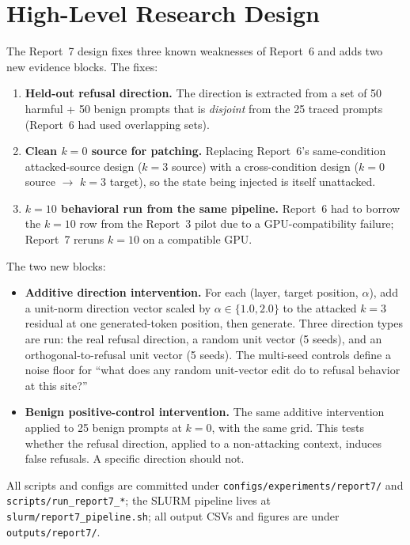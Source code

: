 \documentclass{article}
\begin{document}
\section{High-Level Research Design}
\label{sec:design}

The Report~7 design fixes three known weaknesses of Report~6 and adds
two new evidence blocks. The fixes:

\begin{enumerate}
\item \textbf{Held-out refusal direction.} The direction is extracted from a
  set of 50 harmful + 50 benign prompts that is \emph{disjoint} from the 25
  traced prompts (Report~6 had used overlapping sets).
\item \textbf{Clean $k=0$ source for patching.} Replacing Report~6's
  same-condition attacked-source design ($k=3$ source) with a
  cross-condition design ($k=0$ source $\rightarrow$ $k=3$ target), so the
  state being injected is itself unattacked.
\item \textbf{$k=10$ behavioral run from the same pipeline.} Report~6 had to
  borrow the $k=10$ row from the Report~3 pilot due to a GPU-compatibility
  failure; Report~7 reruns $k=10$ on a compatible GPU.
\end{enumerate}

The two new blocks:

\begin{itemize}
\item \textbf{Additive direction intervention.} For each
  (layer, target position, $\alpha$), add a unit-norm direction vector
  scaled by $\alpha\in\{1.0, 2.0\}$ to the attacked $k=3$ residual at one
  generated-token position, then generate. Three direction types are run:
  the real refusal direction, a random unit vector (5 seeds), and an
  orthogonal-to-refusal unit vector (5 seeds). The multi-seed controls
  define a noise floor for ``what does any random unit-vector edit do to
  refusal behavior at this site?''
\item \textbf{Benign positive-control intervention.} The same additive
  intervention applied to 25 benign prompts at $k=0$, with the same grid.
  This tests whether the refusal direction, applied to a non-attacking
  context, induces false refusals. A specific direction should not.
\end{itemize}

All scripts and configs are committed under
\texttt{configs/experiments/report7/} and
\texttt{scripts/run\_report7\_*}; the SLURM pipeline lives at
\texttt{slurm/report7\_pipeline.sh}; all output CSVs and figures are under
\texttt{outputs/report7/}.
\end{document}
